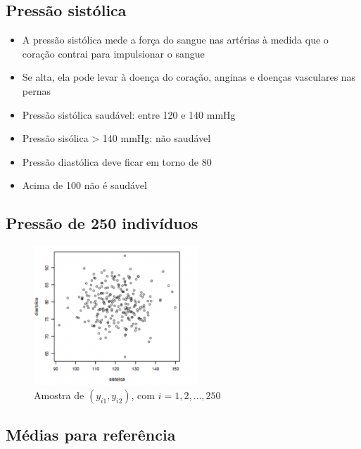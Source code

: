 \documentclass[
  letterpaper,
  DIV=11,
  numbers=noendperiod]{scrartcl}
\providecommand{\tightlist}{%
  \setlength{\itemsep}{0pt}\setlength{\parskip}{0pt}}\usepackage{longtable,booktabs,array}
\begin{document}
\hypertarget{pressuxe3o-sistuxf3lica}{%
\subsection{Pressão sistólica}\label{pressuxe3o-sistuxf3lica}}

\begin{itemize}
\tightlist
\item
  A pressão sistólica mede a força do sangue nas artérias à medida que o
  coração contrai para impulsionar o sangue
\item
  Se alta, ela pode levar à doença do coração, anginas e doenças
  vasculares nas pernas
\item
  Pressão sistólica saudável: entre 120 e 140 mmHg
\item
  Pressão sisólica \textgreater{} 140 mmHg: não saudável
\item
  Pressão diastólica deve ficar em torno de 80
\item
  Acima de 100 não é saudável
\end{itemize}

\hypertarget{pressuxe3o-de-250-indivuxedduos}{%
\subsection{Pressão de 250
indivíduos}\label{pressuxe3o-de-250-indivuxedduos}}

\begin{figure}

{\centering \includegraphics[width=0.55\textwidth,height=\textheight]{figs/Aula07/pressao.png}

}

\caption{Amostra de \((y_{i1}, y_{i2})\), com \(i = 1,2,\ldots, 250\)}

\end{figure}

\hypertarget{muxe9dias-para-referuxeancia}{%
\subsection{Médias para referência}\label{muxe9dias-para-referuxeancia}}
\end{document}

